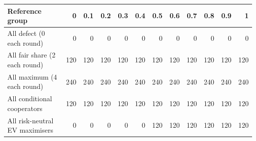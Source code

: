 \begin{tabular}{lrrrrrrrrrrr}
\toprule
Reference group & 0 & 0.1 & 0.2 & 0.3 & 0.4 & 0.5 & 0.6 & 0.7 & 0.8 & 0.9 & 1 \\
\midrule
All defect (0 each round) & 0 & 0 & 0 & 0 & 0 & 0 & 0 & 0 & 0 & 0 & 0 \\
All fair share (2 each round) & 120 & 120 & 120 & 120 & 120 & 120 & 120 & 120 & 120 & 120 & 120 \\
All maximum (4 each round) & 240 & 240 & 240 & 240 & 240 & 240 & 240 & 240 & 240 & 240 & 240 \\
All conditional cooperators & 120 & 120 & 120 & 120 & 120 & 120 & 120 & 120 & 120 & 120 & 120 \\
All risk-neutral EV maximisers & 0 & 0 & 0 & 0 & 0 & 120 & 120 & 120 & 120 & 120 & 120 \\
\bottomrule
\end{tabular}
